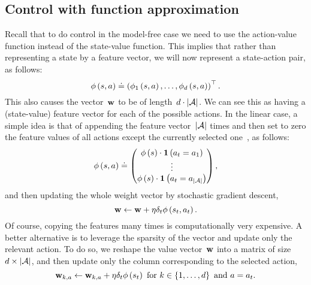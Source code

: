 \subsection{Control with function approximation}
Recall that to do control in the model-free case we need to use the action-value function instead of the state-value function. This implies that rather than representing a state by a feature vector, we will now represent a state-action pair, as follows:
\begin{equation}
	\featurevector\left(\state,\action\right)\doteq\left(\featurevectorcomponent_{1}\left(\state,\action\right),\dots,\featurevectorcomponent_{\parametersize}\left(\state,\action\right)\right)^{\top}.
\end{equation}
This also causes the vector~${\mathbf{w}}$ to be of length~${d\cdot\left\lvert\mathcal{A}\right\rvert}$. We can see this as having a (state-value) feature vector for each of the possible actions. In the linear case, a simple idea is that of appending the feature vector~${\lvert\mathcal{A}\rvert}$ times and then set to zero the feature values of all actions except the currently selected one~\cite{lagoudakis2003lspi}, as follows:
\begin{equation}
	\featurevector\left(\state,\action\right)\doteq
	\begin{pmatrix}
		\featurevector\left(\state\right)\cdot\mathbf{1}\left(\randomaction_{\timestep}=\action_{1}\right) \\
		\vdots \\
		\featurevector\left(\state\right)\cdot\mathbf{1}\left(\randomaction_{\timestep}=\action_{\left\lvert\actionspace\right\rvert}\right)
	\end{pmatrix},
\end{equation}
and then updating the whole weight vector by stochastic gradient descent,
\begin{equation}
	\mathbf{w}\gets\mathbf{w}+\eta\delta_{t}\phi\left(s_{t},a_{t}\right).
\end{equation}
Of course, copying the features many times is computationally very expensive. A better alternative is to leverage the sparsity of the vector and update only the relevant action. To do so, we reshape the value vector~$\mathbf{w}$ into a matrix of size~$d\times\left\lvert\mathcal{A}\right\rvert$, and then update only the column corresponding to the selected action,
\begin{equation}
	\valueparameter_{\indexletter,\action}\gets\valueparameter_{\indexletter,\action}+\gradientstep\tderror_{\timestep}\featurevector\left(\randomstate_{\timestep}\right)~\textnormal{for}~\indexletter\in\left\{1,\dots,\parametersize\right\}~\textnormal{and}~\action=\randomaction_{\timestep}.
\end{equation}


